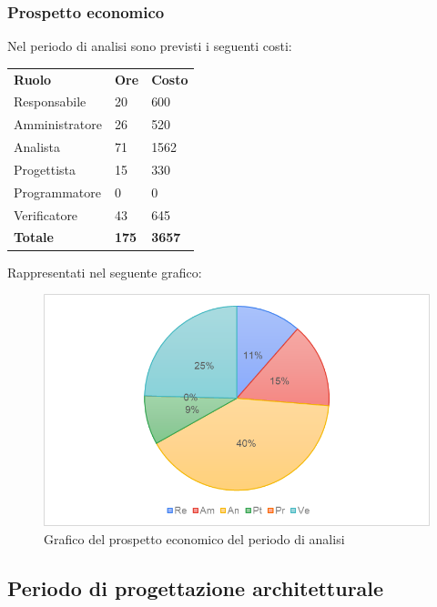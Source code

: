 		\subsubsection{Prospetto economico}
		Nel periodo di analisi sono previsti i seguenti costi:
		\begin{longtable} {
			>{}p{32mm}
			>{}p{20mm}
			>{}p{20mm}
		}
		\rowcolor{gray!50}
		
		\textbf{Ruolo} & \textbf{Ore} & \textbf{Costo} \TBstrut \\
		Responsabile & 20 & 600 \TBstrut \\
		Amministratore & 26 & 520 \TBstrut \\
		Analista & 71 & 1562 \TBstrut \\
		Progettista & 15 & 330 \TBstrut \\
		Programmatore & 0 & 0 \TBstrut \\
		Verificatore & 43 & 645 \TBstrut \\
		\textbf{Totale} & \textbf{175}& \textbf{3657} \TBstrut \\		
		\end{longtable}
		Rappresentati nel seguente grafico: \\
		\begin{figure} [h!]
			\includegraphics[width=\linewidth]{./img/Grafici/2.png}
			\caption{Grafico del prospetto economico del periodo di analisi}
		\end{figure}
\subsection{Periodo di progettazione architetturale}
